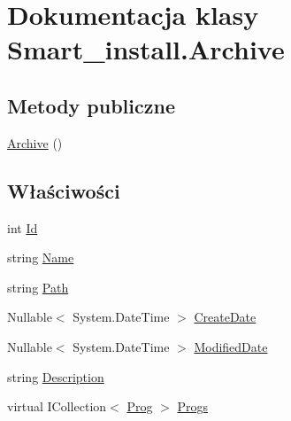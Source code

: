 \hypertarget{class_smart__install_1_1_archive}{\section{Dokumentacja klasy Smart\+\_\+install.\+Archive}
\label{class_smart__install_1_1_archive}
}
\subsection*{Metody publiczne}
\begin{DoxyCompactItemize}
\item 
\hyperlink{class_smart__install_1_1_archive_a82cb112c00eda77255937ffb038c90d8}{Archive} ()
\end{DoxyCompactItemize}
\subsection*{Właściwości}
\begin{DoxyCompactItemize}
\item 
int \hyperlink{class_smart__install_1_1_archive_afd080039becc9c704f1d4d2cd8e590f3}{Id}
\item 
string \hyperlink{class_smart__install_1_1_archive_ab2a5b01802980603eac526169f0f4366}{Name}
\item 
string \hyperlink{class_smart__install_1_1_archive_a40e8f14a943da30b52300495888eab9a}{Path}
\item 
Nullable$<$ System.\+Date\+Time $>$ \hyperlink{class_smart__install_1_1_archive_a6eb9ecd6f2c8a25d62e509ed46e69621}{Create\+Date}
\item 
Nullable$<$ System.\+Date\+Time $>$ \hyperlink{class_smart__install_1_1_archive_abd1dc9feb078ec7db9e3f63fef8a3db6}{Modified\+Date}
\item 
string \hyperlink{class_smart__install_1_1_archive_ae39bf3c2778783c5c68ad0e8a5b0e966}{Description}
\item 
virtual I\+Collection$<$ \hyperlink{class_smart__install_1_1_prog}{Prog} $>$ \hyperlink{class_smart__install_1_1_archive_aee224a0c3036cd495e63818a2efa4218}{Progs}
\end{DoxyCompactItemize}


